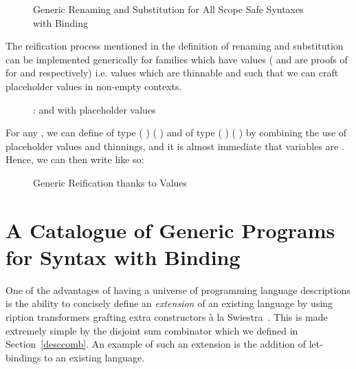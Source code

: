 \begin{figure}[h]
\begin{minipage}{0.5\textwidth}
\end{minipage}\hfill
\begin{minipage}{0.5\textwidth}
\end{minipage}
\caption{Generic Renaming and Substitution for All Scope Safe Syntaxes with Binding}
\end{figure}

The reification process mentioned in the definition of renaming
and substitution can be implemented generically for \semrec{}
families which have  values ( and 
are proofs of  for  and  respectively) i.e.
values which are thinnable and such that we can craft placeholder values
in non-empty contexts.

\begin{figure}[h]
\caption{:  and with placeholder values}
\end{figure}

For any  , we can define  of
type {( )  ( \AF{++} )} and  of
type {( )  ( \AF{++} )} by combining the use
of placeholder values and thinnings, and it is almost immediate that variables
are . Hence, we can then write  like so:

\begin{figure}[h]
\caption{Generic Reification thanks to  Values}
\end{figure}




\section{A Catalogue of Generic Programs for Syntax with Binding}

One of the advantages of having a universe of programming language
descriptions is the ability to concisely define an \emph{extension}
of an existing language by using ription transformers
grafting extra constructors à la Swiestra~\citeyear{swierstra_2008}.
This is made extremely simple by the
disjoint sum combinator  which we defined in Section~\ref{desccomb}.
An example of such an extension is the addition of let-bindings to
an existing language.

